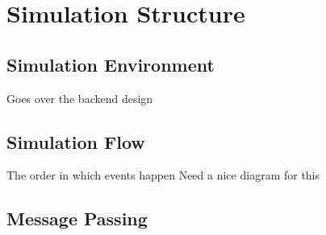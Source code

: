 \chapter{Simulation Structure}\label{simulation_structure}

\section{Simulation Environment}\label{simulation_environment}
Goes over the backend design

\section{Simulation Flow}\label{simulation_flow}
The order in which events happen
Need a nice diagram for this

\section{Message Passing}\label{message_passing}
